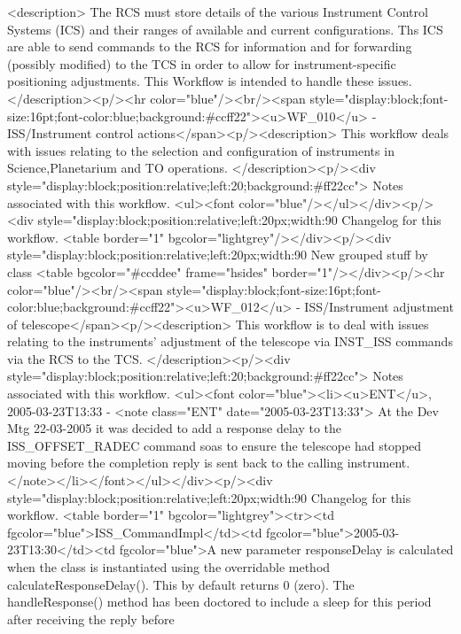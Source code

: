     <description> 
      The RCS must store details of the various Instrument Control Systems (ICS) and their
      ranges of available and current configurations. Ths ICS are able to send commands to
      the RCS for information and for forwarding (possibly modified) to the TCS in order to
      allow for instrument-specific positioning adjustments. This Workflow is intended to
      handle these issues.
    </description><p/><hr color="blue"/><br/><span style="display:block;font-size:16pt;font-color:blue;background:#ccff22"><u>WF_010</u> -    ISS/Instrument control actions</span><p/><description>
	This workflow deals with issues relating to the selection and configuration of
	instruments in Science,Planetarium and TO operations.
      </description><p/><div style="display:block;position:relative;left:20;background:#ff22cc">
      Notes associated with this workflow.
      <ul><font color="blue"/></ul></div><p/><div style="display:block;position:relative;left:20px;width:90%
      Changelog for this workflow.
      <table border="1" bgcolor="lightgrey"/></div><p/><div style="display:block;position:relative;left:20px;width:90%
     New grouped stuff by class
     <table bgcolor="#ccddee" frame="hsides" border="1"/></div><p/><hr color="blue"/><br/><span style="display:block;font-size:16pt;font-color:blue;background:#ccff22"><u>WF_012</u> -    ISS/Instrument adjustment of telescope</span><p/><description>
	This workflow is to deal with issues relating to the instruments' adjustment of
	the telescope via INST_ISS commands via the RCS to the TCS.
      </description><p/><div style="display:block;position:relative;left:20;background:#ff22cc">
      Notes associated with this workflow.
      <ul><font color="blue"><li><u>ENT</u>, 2005-03-23T13:33 -  <note class="ENT" date="2005-03-23T13:33">
	At the Dev Mtg 22-03-2005 it was decided to add a response delay to the ISS_OFFSET_RADEC
	command soas to ensure the telescope had stopped moving before the completion reply is
	sent back to the calling instrument.
      </note></li></font></ul></div><p/><div style="display:block;position:relative;left:20px;width:90%
      Changelog for this workflow.
      <table border="1" bgcolor="lightgrey"><tr><td fgcolor="blue">ISS_CommandImpl</td><td fgcolor="blue">2005-03-23T13:30</td><td fgcolor="blue">A new parameter responseDelay is calculated when the class is instantiated using
	    the overridable method calculateResponseDelay(). This by default returns 0 (zero). The 
	    handleResponse() method has been doctored to include a sleep for this period after receiving the reply before

